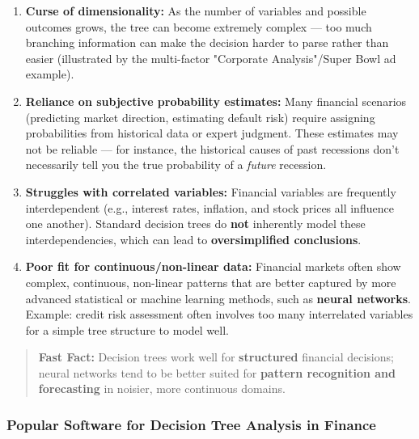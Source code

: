 \documentclass[12pt,openany]{book}
\begin{document}
\begin{enumerate}[leftmargin=*]
    \item \textbf{Curse of dimensionality:} As the number of variables and possible outcomes grows, the tree can become extremely complex --- too much branching information can make the decision harder to parse rather than easier (illustrated by the multi-factor "Corporate Analysis"/Super Bowl ad example).

    \item \textbf{Reliance on subjective probability estimates:} Many financial scenarios (predicting market direction, estimating default risk) require assigning probabilities from historical data or expert judgment. These estimates may not be reliable --- for instance, the historical causes of past recessions don't necessarily tell you the true probability of a \textit{future} recession.

    \item \textbf{Struggles with correlated variables:} Financial variables are frequently interdependent (e.g., interest rates, inflation, and stock prices all influence one another). Standard decision trees do \textbf{not} inherently model these interdependencies, which can lead to \textbf{oversimplified conclusions}.

    \item \textbf{Poor fit for continuous/non-linear data:} Financial markets often show complex, continuous, non-linear patterns that are better captured by more advanced statistical or machine learning methods, such as \textbf{neural networks}. Example: credit risk assessment often involves too many interrelated variables for a simple tree structure to model well.

\end{enumerate}

\begin{quote}
\textbf{Fast Fact:} Decision trees work well for \textbf{structured} financial decisions; neural networks tend to be better suited for \textbf{pattern recognition and forecasting} in noisier, more continuous domains.
\end{quote}


\subsubsection{Popular Software for Decision Tree Analysis in Finance}
\end{document}
